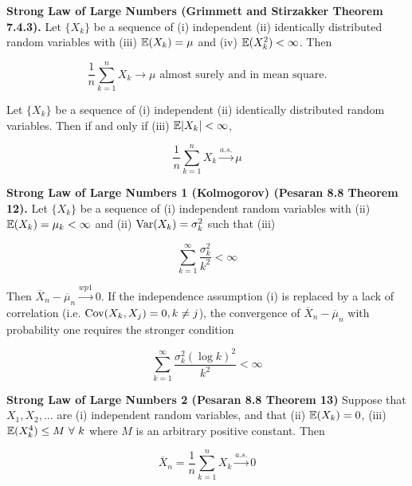 \begin{theorem}\label{asym.lln1} \textbf{Strong Law of Large Numbers (Grimmett and Stirzakker Theorem 7.4.3).} Let \(\{X_k\}\) be a sequence of (i) independent (ii) identically distributed random variables with (iii) \(\mathbb{E}(X_k) = \mu \) and (iv) \(\mathbb{E}(X_k^2) < \infty \). Then 

\[
\frac{1}{n} \sum_{k=1}^n X_k \rightarrow \mu \text{ almost surely and in mean square.}
\]

\end{theorem}

\begin{theorem}\label{asym.lln2} Let \(\{X_k\}\) be a sequence of (i) independent (ii) identically distributed random variables. Then if and only if (iii) \(\mathbb{E}|X_k|  < \infty \),

\[
\frac{1}{n} \sum_{k=1}^n X_k \xrightarrow{a.s.} \mu
\]

\end{theorem}

\begin{theorem}\textbf{Strong Law of Large Numbers 1 (Kolmogorov) (Pesaran 8.8 Theorem 12).} Let \(\{X_k\}\) be a sequence of (i) independent random variables with (ii) \(\mathbb{E}(X_k) = \mu_k < \infty\) and (ii) \(\mathrm{Var}(X_k) =\sigma_k^2\) such that (iii)

\[
\sum_{k=1}^\infty \frac{\sigma_k^2}{k^2} < \infty
\]

Then \(\overline{X}_n - \overline{\mu}_n \xrightarrow{wp1} 0 \). If the independence assumption (i) is replaced by a lack of correlation (i.e. \(\mathrm{Cov}(X_k, X_j) = 0, k \neq j\)), the convergence of \(\overline{X}_n - \overline{\mu}_n\) with probability one requires the stronger condition

\[
\sum_{k=1}^\infty \frac{\sigma_k^2 (\log k)^2}{k^2} < \infty
\]
\end{theorem}

\begin{theorem}\textbf{Strong Law of Large Numbers 2 (Pesaran 8.8 Theorem 13)} Suppose that \(X_1, X_2, \ldots\) are (i) independent random variables, and that (ii) \(\mathbb{E}(X_k) = 0\), (iii) \(\mathbb{E}(X_k^4) \leq M \ \forall \ k\) where \(M\) is an arbitrary positive constant. Then 

\[
\overline{X}_n = \frac{1}{n} \sum_{k=1}^n X_k \xrightarrow{a.s.} 0
\] 

\end{theorem}

